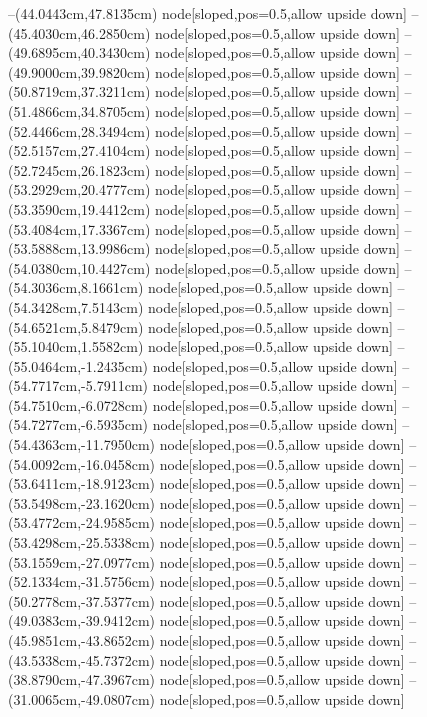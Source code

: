 --(44.0443cm,47.8135cm) node[sloped,pos=0.5,allow upside down]{\ArrowIn}
--(45.4030cm,46.2850cm) node[sloped,pos=0.5,allow upside down]{\ArrowIn}
--(49.6895cm,40.3430cm) node[sloped,pos=0.5,allow upside down]{\ArrowIn}
--(49.9000cm,39.9820cm) node[sloped,pos=0.5,allow upside down]{\arrowIn}
--(50.8719cm,37.3211cm) node[sloped,pos=0.5,allow upside down]{\ArrowIn}
--(51.4866cm,34.8705cm) node[sloped,pos=0.5,allow upside down]{\ArrowIn}
--(52.4466cm,28.3494cm) node[sloped,pos=0.5,allow upside down]{\ArrowIn}
--(52.5157cm,27.4104cm) node[sloped,pos=0.5,allow upside down]{\arrowIn}
--(52.7245cm,26.1823cm) node[sloped,pos=0.5,allow upside down]{\ArrowIn}
--(53.2929cm,20.4777cm) node[sloped,pos=0.5,allow upside down]{\ArrowIn}
--(53.3590cm,19.4412cm) node[sloped,pos=0.5,allow upside down]{\ArrowIn}
--(53.4084cm,17.3367cm) node[sloped,pos=0.5,allow upside down]{\ArrowIn}
--(53.5888cm,13.9986cm) node[sloped,pos=0.5,allow upside down]{\ArrowIn}
--(54.0380cm,10.4427cm) node[sloped,pos=0.5,allow upside down]{\ArrowIn}
--(54.3036cm,8.1661cm) node[sloped,pos=0.5,allow upside down]{\ArrowIn}
--(54.3428cm,7.5143cm) node[sloped,pos=0.5,allow upside down]{\arrowIn}
--(54.6521cm,5.8479cm) node[sloped,pos=0.5,allow upside down]{\ArrowIn}
--(55.1040cm,1.5582cm) node[sloped,pos=0.5,allow upside down]{\ArrowIn}
--(55.0464cm,-1.2435cm) node[sloped,pos=0.5,allow upside down]{\ArrowIn}
--(54.7717cm,-5.7911cm) node[sloped,pos=0.5,allow upside down]{\ArrowIn}
--(54.7510cm,-6.0728cm) node[sloped,pos=0.5,allow upside down]{\arrowIn}
--(54.7277cm,-6.5935cm) node[sloped,pos=0.5,allow upside down]{\arrowIn}
--(54.4363cm,-11.7950cm) node[sloped,pos=0.5,allow upside down]{\ArrowIn}
--(54.0092cm,-16.0458cm) node[sloped,pos=0.5,allow upside down]{\ArrowIn}
--(53.6411cm,-18.9123cm) node[sloped,pos=0.5,allow upside down]{\ArrowIn}
--(53.5498cm,-23.1620cm) node[sloped,pos=0.5,allow upside down]{\ArrowIn}
--(53.4772cm,-24.9585cm) node[sloped,pos=0.5,allow upside down]{\ArrowIn}
--(53.4298cm,-25.5338cm) node[sloped,pos=0.5,allow upside down]{\arrowIn}
--(53.1559cm,-27.0977cm) node[sloped,pos=0.5,allow upside down]{\ArrowIn}
--(52.1334cm,-31.5756cm) node[sloped,pos=0.5,allow upside down]{\ArrowIn}
--(50.2778cm,-37.5377cm) node[sloped,pos=0.5,allow upside down]{\ArrowIn}
--(49.0383cm,-39.9412cm) node[sloped,pos=0.5,allow upside down]{\ArrowIn}
--(45.9851cm,-43.8652cm) node[sloped,pos=0.5,allow upside down]{\ArrowIn}
--(43.5338cm,-45.7372cm) node[sloped,pos=0.5,allow upside down]{\ArrowIn}
--(38.8790cm,-47.3967cm) node[sloped,pos=0.5,allow upside down]{\ArrowIn}
--(31.0065cm,-49.0807cm) node[sloped,pos=0.5,allow upside down]{\ArrowIn}
